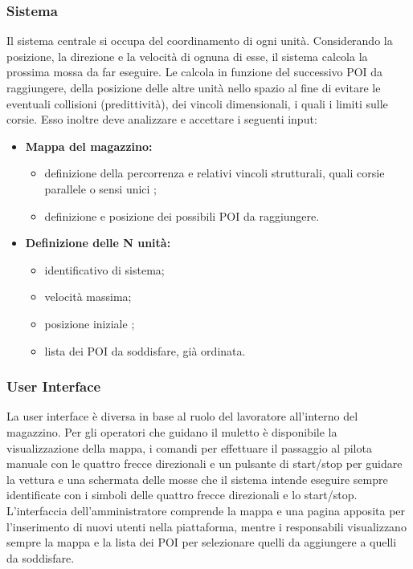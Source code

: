 \subsubsection{Sistema}
Il sistema centrale si occupa del coordinamento di ogni unità. Considerando la posizione, la direzione e la velocità di ognuna di esse, il sistema calcola la prossima mossa da far eseguire. Le calcola in funzione del successivo POI da raggiungere, della posizione delle altre unità nello spazio al fine di evitare le eventuali collisioni (predittività), dei vincoli dimensionali, i quali i limiti sulle corsie. Esso inoltre deve analizzare e accettare i seguenti input:
\begin{itemize}
	\item{\textbf{Mappa del magazzino:} }
			\begin{itemize}
			\item{definizione della percorrenza e relativi vincoli strutturali, quali corsie parallele o sensi unici ;}
			\item{definizione e posizione dei possibili POI da raggiungere.}
			\end{itemize}
	\item{\textbf{Definizione delle N unità:}}
			\begin{itemize}
			\item{identificativo di sistema;} 
			\item{velocità massima; } 
			\item{posizione iniziale ;} 
			\item{lista dei POI da soddisfare, già ordinata.}
			\end{itemize}
\end{itemize}

\subsubsection{User Interface} 
La user interface è diversa in base al ruolo del lavoratore all'interno del magazzino. Per gli operatori che guidano il muletto è disponibile la visualizzazione della mappa, i comandi per effettuare il passaggio al pilota manuale con le quattro frecce direzionali e un pulsante di start/stop per guidare la vettura e una schermata delle mosse che il sistema intende eseguire sempre identificate con i simboli delle quattro frecce direzionali e lo start/stop. 
L'interfaccia dell'amministratore comprende la mappa e una pagina apposita per l'inserimento di nuovi utenti nella piattaforma, mentre i responsabili visualizzano sempre la mappa e la lista dei POI per selezionare quelli da aggiungere a quelli da soddisfare.


